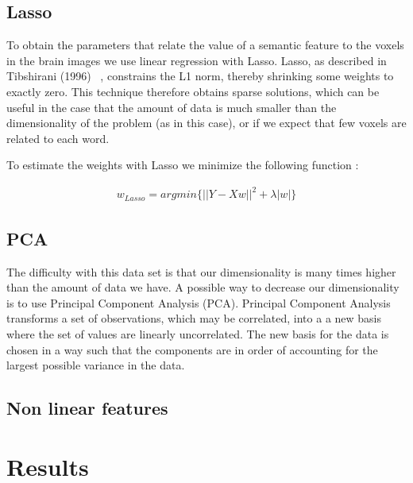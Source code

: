 \documentclass{article} %
\begin{document}
\subsection{Lasso}

To obtain the parameters that relate the value of a semantic feature to the voxels in the brain images we use linear regression with Lasso. Lasso, as described in Tibshirani (1996) ~\cite{lasso}, constrains the L1 norm, thereby shrinking some weights to exactly zero. This technique therefore obtains sparse solutions, which can be useful in the case that the amount of data is much smaller than the dimensionality of the problem (as in this case), or if we expect that few voxels are related to each word. 

To estimate the weights with Lasso we minimize the following function :

\begin{align*}
w_{Lasso} = argmin \{|| Y - Xw ||^2 + \lambda|w|\}
\end{align*}




\subsection{PCA}

The difficulty with this data set is that our dimensionality is many times higher than the amount of data we have. A possible way to decrease our dimensionality is to use Principal Component Analysis (PCA). Principal Component Analysis transforms a set of observations, which may be correlated, into a a new basis where the set of values are linearly uncorrelated. The new basis for the data is chosen in a way such that the components are in order of accounting for the largest possible variance in the data. 


\subsection{Non linear features}



\section{Results}
\end{document}
